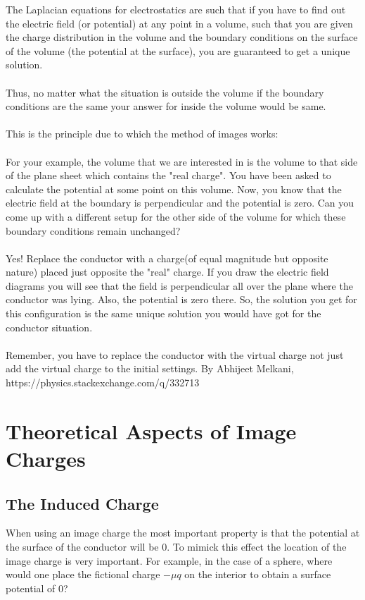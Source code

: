 \begin{tcolorbox}[title = Explaination of why to use image charges]
    The Laplacian equations for electrostatics are such that if you have to find out the electric field (or potential) at any point in a volume, such that you are given the charge distribution in the volume and the boundary conditions on the surface of the volume (the potential at the surface), you are guaranteed to get a unique solution.\\
    \\
    \noindent Thus, no matter what the situation is outside the volume if the boundary conditions are the same your answer for inside the volume would be same.\\
    \\
    \noindent This is the principle due to which the method of images works:\\
    \\
    \noindent For your example, the volume that we are interested in is the volume to that side of the plane sheet which contains the "real charge". You have been asked to calculate the potential at some point on this volume. Now, you know that the electric field at the boundary is perpendicular and the potential is zero. Can you come up with a different setup for the other side of the volume for which these boundary conditions remain unchanged?\\
    \\
    \noindent Yes! Replace the conductor with a charge(of equal magnitude but opposite nature) placed just opposite the "real" charge. If you draw the electric field diagrams you will see that the field is perpendicular all over the plane where the conductor was lying. Also, the potential is zero there. So, the solution you get for this configuration is the same unique solution you would have got for the conductor situation.\\
    \\
    \noindent Remember, you have to replace the conductor with the virtual charge not just add the virtual charge to the initial settings.
    \tcblower
    By Abhijeet Melkani, https://physics.stackexchange.com/q/332713
\end{tcolorbox}



\section{Theoretical Aspects of Image Charges}
\subsection{The Induced Charge}
When using an image charge the most important property is that the potential at the surface of the conductor will be 0. To mimick this effect the location of the image charge is very important.
For example, in the case of a sphere, where would one place the fictional charge $-\mu q$ on the interior to obtain a surface potential of 0?\\

